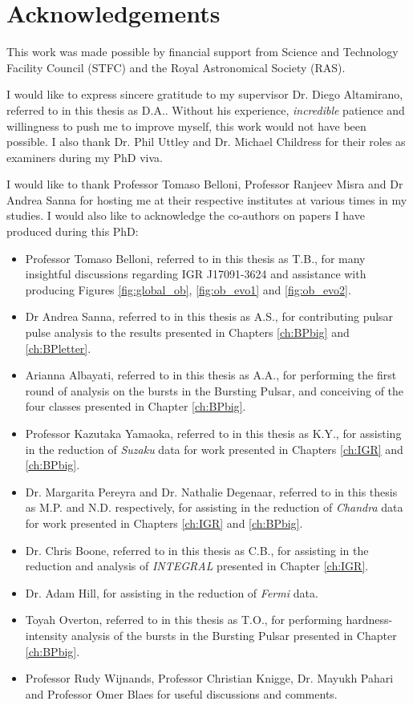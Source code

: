 \chapter*{Acknowledgements}


\par This work was made possible by financial support from Science and Technology Facility Council (STFC) and the Royal Astronomical Society (RAS).
\par I would like to express sincere gratitude to my supervisor Dr. Diego Altamirano, referred to in this thesis as \textsf{D.A.}.  Without his experience, \textit{incredible} patience and willingness to push me to improve myself, this work would not have been possible.  I also thank Dr. Phil Uttley and Dr. Michael Childress for their roles as examiners during my PhD viva.
\par I would like to thank Professor Tomaso Belloni, Professor Ranjeev Misra and Dr Andrea Sanna for hosting me at their respective institutes at various times in my studies.  I would also like to acknowledge the co-authors on papers I have produced during this PhD:
\begin{itemize}
\item Professor Tomaso Belloni, referred to in this thesis as \textsf{T.B.}, for many insightful discussions regarding IGR J17091-3624 and assistance with producing Figures \ref{fig:global_ob}, \ref{fig:ob_evo1} and \ref{fig:ob_evo2}.
\item Dr Andrea Sanna, referred to in this thesis as \textsf{A.S.}, for contributing pulsar pulse analysis to the results presented in Chapters \ref{ch:BPbig} and \ref{ch:BPletter}.
\item Arianna Albayati, referred to in this thesis as \textsf{A.A.}, for performing the first round of analysis on the bursts in the Bursting Pulsar, and conceiving of the four classes presented in Chapter \ref{ch:BPbig}.
\item Professor Kazutaka Yamaoka, referred to in this thesis as \textsf{K.Y.}, for assisting in the reduction of \textit{Suzaku} data for work presented in Chapters \ref{ch:IGR} and \ref{ch:BPbig}.
\item Dr. Margarita Pereyra and Dr. Nathalie Degenaar, referred to in this thesis as \textsf{M.P.} and \textsf{N.D.} respectively, for assisting in the reduction of \textit{Chandra} data for work presented in Chapters \ref{ch:IGR} and \ref{ch:BPbig}.
\item Dr. Chris Boone, referred to in this thesis as \textsf{C.B.}, for assisting in the reduction and analysis of \textit{INTEGRAL} presented in Chapter \ref{ch:IGR}.
\item Dr. Adam Hill, for assisting in the reduction of \textit{Fermi} data.
\item Toyah Overton, referred to in this thesis as \textsf{T.O.}, for performing hardness-intensity analysis of the bursts in the Bursting Pulsar presented in Chapter \ref{ch:BPbig}.
\item Professor Rudy Wijnands, Professor Christian Knigge, Dr. Mayukh Pahari and Professor Omer Blaes for useful discussions and comments.
\end{itemize}
